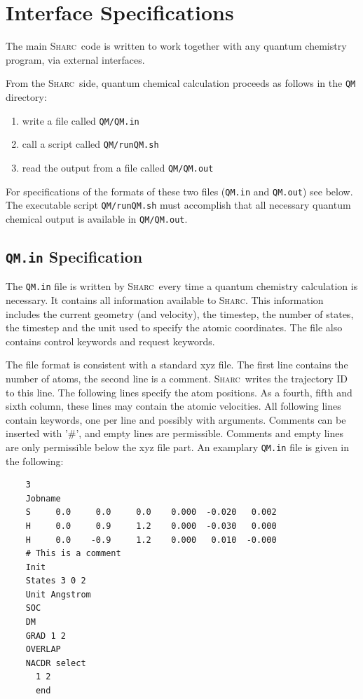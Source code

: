 \documentclass[a4paper,11pt,DIV=15,openany,twoside=false]{scrbook}
\newcommand{\sharc}{\textsc{Sharc}}
\newcommand{\ttt}[1]{\texttt{#1}}
\newenvironment{example}{
  \vspace{0mm}
  \definecolor{shadecolor}{HTML}{BBDDFF}
  \begin{shaded}
  \begin{minipage}{0.9\textwidth}
}{
  \end{minipage}
  \end{shaded}
}
\begin{document}

\section{Interface Specifications}

The main \sharc\ code is written to work together with any quantum chemistry program, via external interfaces. 

From the \sharc\ side, quantum chemical calculation proceeds as follows in the \ttt{QM} directory:
\begin{enumerate}
  \item write a file called \ttt{QM/QM.in}
  \item call a script called \ttt{QM/runQM.sh}
  \item read the output from a file called \ttt{QM/QM.out}
\end{enumerate}
For specifications of the formats of these two files (\ttt{QM.in} and \ttt{QM.out}) see below. The executable script \ttt{QM/runQM.sh} must accomplish that all necessary quantum chemical output is available in \ttt{QM/QM.out}.

\subsection{\ttt{QM.in} Specification}\label{intf:qmin}

The \ttt{QM.in} file is written by \sharc\ every time a quantum chemistry calculation is necessary. It contains all information available to \sharc. This information includes the current geometry (and velocity), the timestep, the number of states, the timestep and the unit used to specify the atomic coordinates. The file also contains control keywords and request keywords. 

The file format is consistent with a standard xyz file. The first line contains the number of atoms, the second line is a comment. \sharc\ writes the trajectory ID to this line. The following lines specify the atom positions. As a fourth, fifth and sixth column, these lines may contain the atomic velocities.
All following lines contain keywords, one per line and possibly with arguments. Comments can be inserted with '\#', and empty lines are permissible. Comments and empty lines are only permissible below the xyz file part.
An examplary \ttt{QM.in} file is given in the following:
\begin{example}
  \begin{verbatim}
    3
    Jobname
    S     0.0     0.0     0.0    0.000  -0.020   0.002
    H     0.0     0.9     1.2    0.000  -0.030   0.000
    H     0.0    -0.9     1.2    0.000   0.010  -0.000
    # This is a comment
    Init
    States 3 0 2
    Unit Angstrom
    SOC
    DM
    GRAD 1 2
    OVERLAP
    NACDR select
      1 2
      end
  \end{verbatim}
\end{example}
\end{document}
